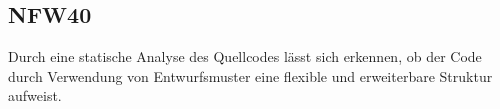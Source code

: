 \subsection*{NFW40}

Durch eine \gls{statische Analyse} des \Gls{Quellcode}s lässt sich erkennen, ob der Code durch Verwendung von \Gls{Entwurfsmuster} eine flexible und erweiterbare Struktur aufweist.
